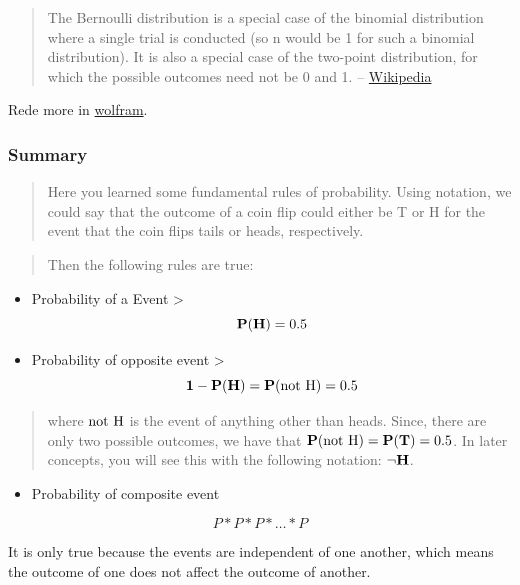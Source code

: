 \documentclass[]{book}
\providecommand{\tightlist}{%
  \setlength{\itemsep}{0pt}\setlength{\parskip}{0pt}}
\begin{document}
\begin{quote}
The Bernoulli distribution is a special case of the binomial
distribution where a single trial is conducted (so n would be 1 for such
a binomial distribution). It is also a special case of the two-point
distribution, for which the possible outcomes need not be 0 and 1. --
\href{https://en.wikipedia.org/wiki/Bernoulli_distribution}{Wikipedia}
\end{quote}

Rede more in
\href{http://mathworld.wolfram.com/BernoulliDistribution.html}{wolfram}.

\subsubsection{Summary}\label{summary}

\begin{quote}
Here you learned some fundamental rules of probability. Using notation,
we could say that the outcome of a coin flip could either be T or H for
the event that the coin flips tails or heads, respectively.
\end{quote}

\begin{quote}
Then the following rules are true:
\end{quote}

\begin{itemize}
\item
  Probability of a Event \textgreater{} \[\bold{P(H)} = 0.5\]
\item
  Probability of opposite event \textgreater{}
  \[\bold{1 - P(H) = P(\text{not H})} = 0.5\]
\end{itemize}

\begin{quote}
where \(\bold{\text{not H}}\) is the event of anything other than heads.
Since, there are only two possible outcomes, we have that
\(\bold{P(\text{not H}) = P(T)} = 0.5\). In later concepts, you will see
this with the following notation: \(\bold{\lnot H}\).
\end{quote}

\begin{itemize}
\tightlist
\item
  Probability of composite event
\end{itemize}

\[ P * P * P * \dots * P \]

It is only true because the events are independent of one another, which
means the outcome of one does not affect the outcome of another.
\end{document}
